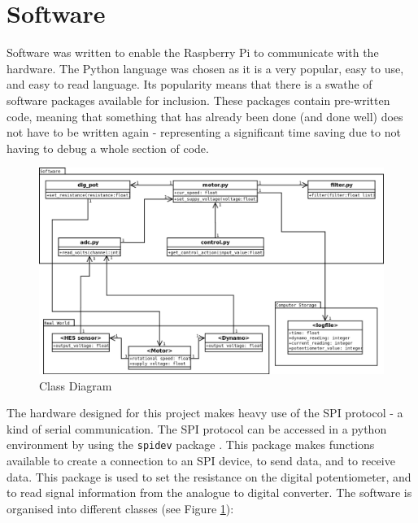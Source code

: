 \documentclass[twoside,a4]{report}
\def\br{\newline \newline \noindent}
\def\rpi{Raspberry Pi }
\begin{document}
	\section{Software} %
	Software was written to enable the \rpi to communicate with the hardware. The Python language was chosen as it is a very popular, easy to use, and easy to read language. Its popularity means that there is a swathe of software packages available for inclusion. These packages contain pre-written code, meaning that something that has already been done (and done well) does not have to be written again - representing a significant time saving due to not having to debug a whole section of code.
		\begin{figure}[!htb]
			\centering
			\includegraphics[scale=0.25]{images/codemap.png}
			\caption{Class Diagram}
			\label{figcladia}
		\end{figure} \newline  \noindent
	The hardware designed for this project makes heavy use of the SPI protocol - a kind of serial communication. The SPI protocol can be accessed in a python environment by using the \texttt{spidev} package \cite{srcspidev}. This package makes functions available to create a connection to an SPI device, to send data, and to receive data. This package is used to set the resistance on the digital potentiometer, and to read signal information from the analogue to digital converter. \br
	The software is organised into different classes (see Figure \ref{figcladia}):
\end{document}
